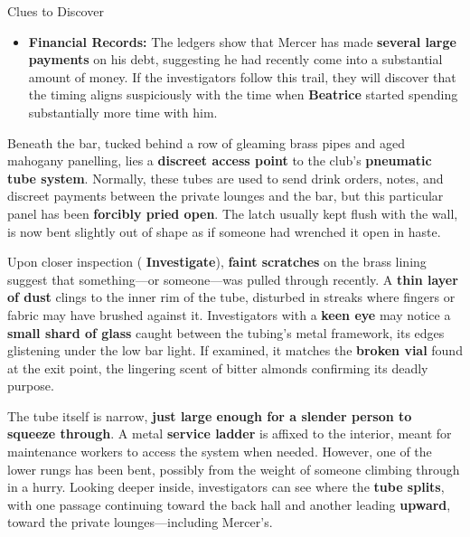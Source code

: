 \begin{CommentBox}{Clues to Discover}  
	\begin{itemize}  
		\item \textbf{Financial Records:} The ledgers show that Mercer has made \textbf{several large payments} on his debt, suggesting he had recently come into a substantial amount of money. If the investigators follow this trail, they will discover that the timing aligns suspiciously with the time when \textbf{Beatrice} started spending substantially more time with him.  
	\end{itemize}  
\end{CommentBox}  

\begin{Example}
	Beneath the bar, tucked behind a row of gleaming brass pipes and aged mahogany panelling, lies a \textbf{discreet access point} to the club’s \textbf{pneumatic tube system}. Normally, these tubes are used to send drink orders, notes, and discreet payments between the private lounges and the bar, but this particular panel has been \textbf{forcibly pried open}. The latch usually kept flush with the wall, is now bent slightly out of shape as if someone had wrenched it open in haste.  

	Upon closer inspection ( \textbf{Investigate}), \textbf{faint scratches} on the brass lining suggest that something—or someone—was pulled through recently. A \textbf{thin layer of dust} clings to the inner rim of the tube, disturbed in streaks where fingers or fabric may have brushed against it. Investigators with a \textbf{keen eye} may notice a \textbf{small shard of glass} caught between the tubing's metal framework, its edges glistening under the low bar light. If examined, it matches the \textbf{broken vial} found at the exit point, the lingering scent of bitter almonds confirming its deadly purpose.  

	The tube itself is narrow, \textbf{just large enough for a slender person to squeeze through}. A metal \textbf{service ladder} is affixed to the interior, meant for maintenance workers to access the system when needed. However, one of the lower rungs has been bent, possibly from the weight of someone climbing through in a hurry. Looking deeper inside, investigators can see where the \textbf{tube splits}, with one passage continuing toward the back hall and another leading \textbf{upward}, toward the private lounges—including Mercer’s.  	
\end{Example}

